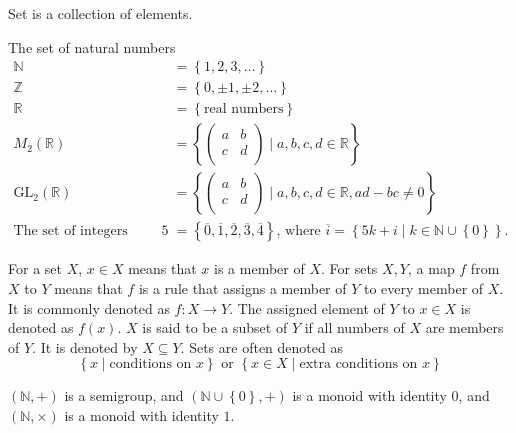 Set is a collection of elements. 
\begin{eg}
    The set of natural numbers 
\begin{align*}
    \mathbb{N} &= \left\{ 1,2,3,\dots  \right\} \\
    \mathbb{Z} &= \left\{ 0, \pm 1, \pm 2, \dots  \right\} \\
    \mathbb{R} &= \left\{ \text{real numbers} \right\} \\
    M_2(\mathbb{R} ) &= \left\{ \begin{pmatrix}
        a & b  \\
        c & d  \\
    \end{pmatrix} \mid a,b,c,d \in \mathbb{R}  \right\}  \\
    \mathrm{GL} _2(\mathbb{R}) &= \left\{ \begin{pmatrix}
        a & b  \\
        c & d  \\
    \end{pmatrix} \mid a,b,c,d \in \mathbb{R} , ad - bc \neq 0\right\} \\
    \text{The set of integers modulo } 5 &= \left\{ \overline{0}, \overline{1}, \overline{2}, \overline{3}, \overline{4} \right\} \text{, where } \overline{i} = \left\{ 5k + i \mid k \in \mathbb{N} \cup \left\{ 0 \right\}   \right\}.
\end{align*}
\end{eg}

\begin{notation}
    For a set \(X\), \(x \in X\) means that \(x\) is a member of \(X\). For sets \(X, Y\), a map \(f\) from \(X\) to \(Y\) means that \(f\) is a rule that assigns a member of \(Y\) to every member of \(X\). It is commonly denoted as \(f: X \to Y\). The assigned element of \(Y\) to \(x \in X\) is denoted as \(f(x)\).     \(X\) is said to be a subset of \(Y\) if all numbers of \(X\) are members of \(Y\). It is denoted by \(X \subseteq Y\). Sets are often denoted as 
    \[
        \left\{ x \mid \text{conditions on } x \right\} \text{ or } \left\{ x \in X \mid \text{extra conditions on } x \right\} 
    \]                
\end{notation}

\begin{eg}
    \((\mathbb{N} , +)\) is a semigroup, and \((\mathbb{N} \cup \left\{ 0 \right\}  , +)\) is a monoid with identity \(0\), and \((\mathbb{N} , \times )\) is a monoid with identity \(1\).  
\end{eg}

